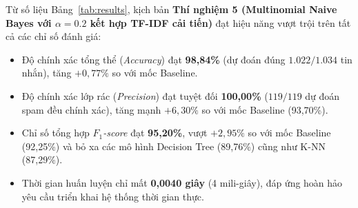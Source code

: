 \documentclass[12pt,a4paper]{report}
\begin{document}
\begin{table}[H]
    \centering
    \caption{Bảng tổng hợp kết quả thực nghiệm của 7 phương án trên tập kiểm thử (1.034 mẫu)}
    \label{tab:results}
\end{table}

Từ số liệu Bảng~\ref{tab:results}, kịch bản \textbf{Thí nghiệm 5 (Multinomial Naive Bayes với $\alpha=0.2$ kết hợp TF-IDF cải tiến)} đạt hiệu năng vượt trội trên tất cả các chỉ số đánh giá:
\begin{itemize}
    \item Độ chính xác tổng thể (\textit{Accuracy}) đạt \textbf{98,84\%} (dự đoán đúng $1.022 / 1.034$ tin nhắn), tăng $+0,77\%$ so với mốc Baseline.
    \item Độ chính xác lớp rác (\textit{Precision}) đạt tuyệt đối \textbf{100,00\%} ($119 / 119$ dự đoán spam đều chính xác), tăng mạnh $+6,30\%$ so với mốc Baseline (93,70\%).
    \item Chỉ số tổng hợp \textit{$F_1$-score} đạt \textbf{95,20\%}, vượt $+2,95\%$ so với mốc Baseline (92,25\%) và bỏ xa các mô hình Decision Tree (89,76\%) cũng như K-NN (87,29\%).
    \item Thời gian huấn luyện chỉ mất \textbf{0,0040 giây} (4 mili-giây), đáp ứng hoàn hảo yêu cầu triển khai hệ thống thời gian thực.
\end{itemize}
\end{document}

